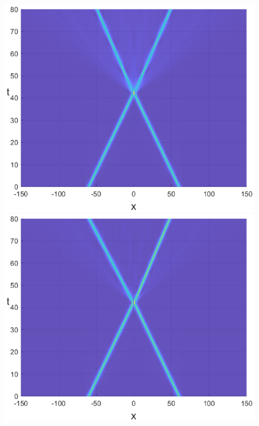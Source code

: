 \documentclass[preprint,12pt]{elsarticle}
\begin{document}
\begin{figure}[H]
\begin{minipage}[h]{0.32\linewidth}
\includegraphics[width=1\linewidth]{fig52.eps}
\end{minipage}
\begin{minipage}[h]{0.32\linewidth}
\includegraphics[width=1\linewidth]{fig55.eps}

\end{minipage}
\end{figure}
\end{document}
